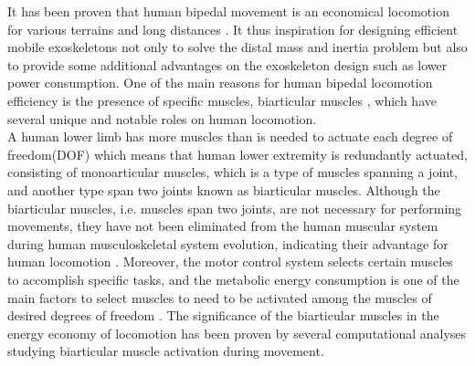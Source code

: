 \documentclass[10pt,letterpaper]{article}
\begin{document}
It has been proven that human bipedal movement is an economical locomotion \cite{1,48} for various terrains \cite{1,49} and long distances \cite{50}. It thus inspiration for designing efficient mobile exoskeletons not only to solve the distal mass and inertia problem but also to provide some additional advantages on the exoskeleton design such as lower power consumption. One of the main reasons for human bipedal locomotion efficiency is the presence of specific muscles, biarticular muscles \cite{51,52,53}, which have several unique and notable roles on human locomotion.\\
A human lower limb has more muscles than is needed to actuate each degree of freedom(DOF) \cite{53} which means that human lower extremity is redundantly actuated, consisting of monoarticular muscles, which is a type of muscles spanning a joint, and another type span two joints known as biarticular muscles. Although the biarticular muscles, i.e. muscles span two joints, are not necessary for performing movements, they have not been eliminated from the human muscular system during human musculoskeletal system evolution, indicating their advantage for human locomotion \cite{53}. Moreover, the motor control system selects certain muscles to accomplish specific tasks\cite{54}, and the metabolic energy consumption is one of the main factors to select muscles to need to be activated among the muscles of desired degrees of freedom \cite{53}. The significance of the biarticular muscles in the energy economy of locomotion has been proven by several computational analyses\cite{55,56} studying biarticular muscle activation during movement.\\
\end{document}
